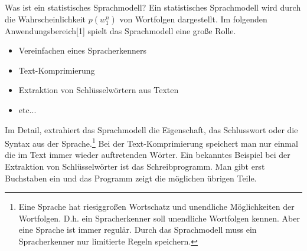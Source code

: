 
Was ist ein statistisches Sprachmodell? Ein statistisches Sprachmodell wird durch die Wahrscheinlichkeit $p(w_{1}^n)$ von Wortfolgen  dargestellt.
Im folgenden Anwendungsbereich[1] spielt das Sprachmodell eine gro\ss e Rolle.
\begin{itemize}
	\item Vereinfachen eines Spracherkenners
	\item Text-Komprimierung
	\item Extraktion von Schl\"usselw\"ortern aus Texten
	\item etc...
\end{itemize}
Im Detail, extrahiert das Sprachmodell die Eigenschaft, das Schlusswort oder die Syntax aus der Sprache.\footnote{Eine Sprache hat riesiggro\ss en Wortschatz und unendliche M\"oglichkeiten der Wortfolgen. D.h. ein Spracherkenner soll unendliche Wortfolgen kennen. Aber eine Sprache ist immer regul\"ar. Durch das Sprachmodell muss ein Spracherkenner  nur  limitierte Regeln speichern.}
Bei der Text-Komprimierung speichert man nur einmal die im Text immer wieder auftretenden W\"orter. Ein bekanntes Beispiel bei der Extraktion von Schl\"usselw\"orter ist das Schreibprogramm. Man gibt erst Buchstaben ein und das Programm zeigt die m\"oglichen \"ubrigen Teile.